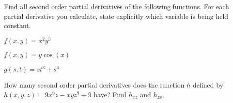 \begin{activity} \label{A:10.3.1} Find all second order partial
  derivatives of the following functions.   For each partial derivative you calculate, state explicitly which variable is being held constant.
  \ba
\item $f(x,y) = x^2y^3$
\item $f(x,y) = y\cos(x)$
\item $g(s,t) = st^3 + s^4$
\item How many second order partial derivatives does the
  function $h$ defined by $h(x,y,z) = 9x^9z-xyz^9 + 9$ have?  Find $h_{xz}$ and
  $h_{zx}$.  
  \ea

\end{activity}
\begin{smallhint}

\end{smallhint}
\begin{bighint}

\end{bighint}
